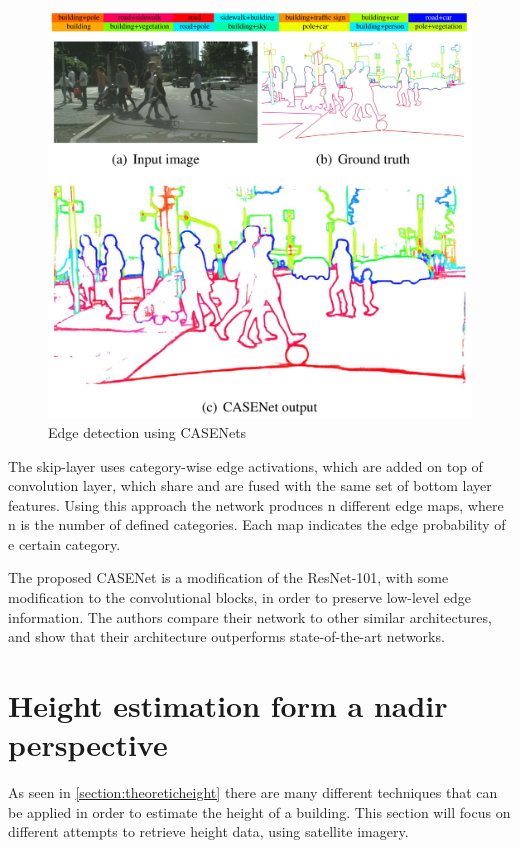 \begin{figure}[!h]
	\centering
	\includegraphics[scale=0.4]{fig/casenet_edge_detection.png}
	\caption{Edge detection using CASENets \citep{Yu2017}}
	\label{fig:casenet}
\end{figure}

The skip-layer uses category-wise edge activations, which are added on top of convolution layer, which share and are fused with the same set of bottom layer features. Using this approach the network produces n different edge maps, where n is the number of defined categories. Each map indicates the edge probability of e certain category.

The proposed CASENet is a modification of the ResNet-101, with some modification to the convolutional blocks, in order to preserve low-level edge information. The authors compare their network to other similar architectures, and show that their architecture outperforms state-of-the-art networks.

\section{Height estimation form a nadir perspective}
As seen in \autoref{section:theoreticheight} there are many different techniques that can be applied in order to estimate the height of a building. This section will focus on different attempts to retrieve height data, using satellite imagery.

